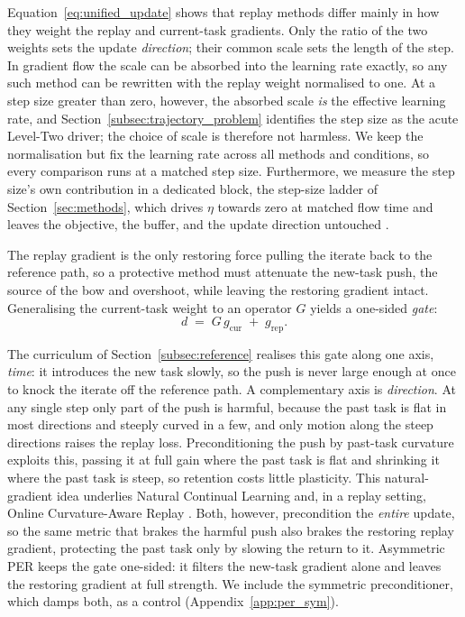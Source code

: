 Equation~\eqref{eq:unified_update} shows that replay methods differ mainly in how they weight the replay and current-task gradients. Only the ratio of the two weights sets the update \emph{direction}; their common scale sets the length of the step. In gradient flow the scale can be absorbed into the learning rate exactly, so any such method can be rewritten with the replay weight normalised to one. At a step size greater than zero, however, the absorbed scale \emph{is} the effective learning rate, and Section~\ref{subsec:trajectory_problem} identifies the step size as the acute Level-Two driver; the choice of scale is therefore not harmless. We keep the normalisation but fix the learning rate across all methods and conditions, so every comparison runs at a matched step size. Furthermore, we measure the step size's own contribution in a dedicated block, the step-size ladder of Section~\ref{sec:methods}, which drives $\eta$ towards zero at matched flow time and leaves the objective, the buffer, and the update direction untouched \citep{obis2025optimizersstabilitygap}.

The replay gradient is the only restoring force pulling the iterate back to the reference path, so a protective method must attenuate the new-task push, the source of the bow and overshoot, while leaving the restoring gradient intact. Generalising the current-task weight to an operator $G$ yields a one-sided \emph{gate}:
\begin{equation}
    d \;=\; G\, g_{\text{cur}} \;+\; g_{\text{rep}}.
    \label{eq:gate}
\end{equation}

The curriculum of Section~\ref{subsec:reference} realises this gate along one axis, \emph{time}: it introduces the new task slowly, so the push is never large enough at once to knock the iterate off the reference path. A complementary axis is \emph{direction}. At any single step only part of the push is harmful, because the past task is flat in most directions and steeply curved in a few, and only motion along the steep directions raises the replay loss. Preconditioning the push by past-task curvature exploits this, passing it at full gain where the past task is flat and shrinking it where the past task is steep, so retention costs little plasticity. This natural-gradient idea \citep{amari1998natural} underlies Natural Continual Learning \citep{kao2021naturalcontinuallearningsuccess} and, in a replay setting, Online Curvature-Aware Replay \citep{urettini2025onlinecurvatureawarereplay}. Both, however, precondition the \emph{entire} update, so the same metric that brakes the harmful push also brakes the restoring replay gradient, protecting the past task only by slowing the return to it. Asymmetric PER keeps the gate one-sided: it filters the new-task gradient alone and leaves the restoring gradient at full strength. We include the symmetric preconditioner, which damps both, as a control (Appendix~\ref{app:per_sym}).

